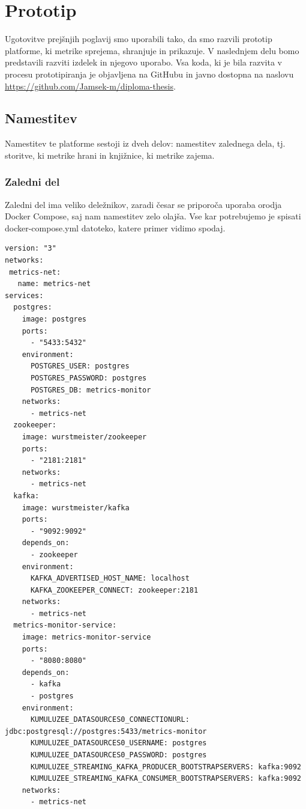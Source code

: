 \documentclass[a4paper, 12pt]{book}
\begin{document}
\section{Prototip}
\label{ch3:sec3}

Ugotovitve prejšnjih poglavij smo uporabili tako, da smo razvili prototip platforme, ki metrike sprejema, shranjuje in prikazuje. V naslednjem delu bomo predstavili razviti izdelek in njegovo uporabo. Vsa koda, ki je bila razvita v procesu prototipiranja je objavljena na GitHubu in javno dostopna na naslovu \url{https://github.com/Jamsek-m/diploma-thesis}.

\subsection{Namestitev}
\label{ch3:sec3:sub1}

Namestitev te platforme sestoji iz dveh delov: namestitev zalednega dela, tj. storitve, ki metrike hrani in knjižnice, ki metrike zajema.

\subsubsection{Zaledni del}

Zaledni del ima veliko deležnikov, zaradi česar se priporoča uporaba orodja Docker Compose, saj nam namestitev zelo olajša. Vse kar potrebujemo je spisati docker-compose.yml datoteko, katere primer vidimo spodaj.

\begin{lstlisting}[label=code:docker_compose, caption=Primer datoteke docker-compose.yml]
version: "3"
networks:
 metrics-net:
   name: metrics-net
services:
  postgres:
    image: postgres
    ports:
      - "5433:5432"
    environment:
      POSTGRES_USER: postgres
      POSTGRES_PASSWORD: postgres
      POSTGRES_DB: metrics-monitor
    networks:
      - metrics-net
  zookeeper:
    image: wurstmeister/zookeeper
    ports:
      - "2181:2181"
    networks:
      - metrics-net
  kafka:
    image: wurstmeister/kafka
    ports:
      - "9092:9092"
    depends_on:
      - zookeeper
    environment:
      KAFKA_ADVERTISED_HOST_NAME: localhost
      KAFKA_ZOOKEEPER_CONNECT: zookeeper:2181
    networks:
      - metrics-net
  metrics-monitor-service:
    image: metrics-monitor-service
    ports:
      - "8080:8080"
    depends_on:
      - kafka
      - postgres
    environment:
      KUMULUZEE_DATASOURCES0_CONNECTIONURL: jdbc:postgresql://postgres:5433/metrics-monitor
      KUMULUZEE_DATASOURCES0_USERNAME: postgres
      KUMULUZEE_DATASOURCES0_PASSWORD: postgres
      KUMULUZEE_STREAMING_KAFKA_PRODUCER_BOOTSTRAPSERVERS: kafka:9092
      KUMULUZEE_STREAMING_KAFKA_CONSUMER_BOOTSTRAPSERVERS: kafka:9092
    networks:
      - metrics-net
\end{lstlisting}
\end{document}
